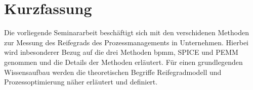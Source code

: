 \newpage
{}
\section*{Kurzfassung}

Die vorliegende Seminararbeit beschäftigt sich mit den verschidenen Methoden zur Messung des Reifegrads des Prozessmanagements
in Unternehmen. Hierbei wird inbesonderer Bezug auf die drei Methoden \acs{bpmm}, SPICE und PEMM genommen und die Details der Methoden
erläutert. Für einen grundlegenden Wissensaufbau werden die theoretischen Begriffe Reifegradmodell und Prozessoptimierung näher erläutert und
definiert.